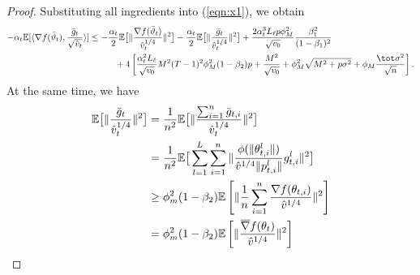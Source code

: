 \documentclass{article}
\begin{document}
\begin{proof}
Substituting all ingredients into (\ref{eqn:x1}), we obtain
\begin{align}\notag
    -\alpha_t \mathbb E[\langle \nabla f(\bar \vartheta_t),\frac{\bar g_t}{\sqrt{\hat v_t}} \rangle] &\leq -\frac{\alpha_t}{2}\mathbb E\big[\Vert \frac{\nabla f(\bar\vartheta_t) }{\hat v_t^{1/4}}\Vert^2 \big]-\frac{\alpha_t}{2}\mathbb E\big[\Vert \frac{\bar g_t }{\hat v_t^{1/4}}\Vert^2 \big]+\frac{2\alpha_t^3 L_\ell p\phi_M^2}{ \sqrt{v_0}}\frac{\beta_1^2}{(1-\beta_1)^2} \\\notag
    &\hspace{0.4in}  + 4 \left[ \frac{\alpha_t^2 L_\ell}{\sqrt{v_0}} M^2 (T-1)^2 \phi_M^2 (1-\beta_2)p + \frac{M^2}{\sqrt{v_0}}+\phi_M^2\sqrt{M^2+p\sigma^2} + \phi_M \frac{\tot \sigma^2}{\sqrt{n}}\right].
\end{align}
At the same time, we have
\begin{align}\notag
    \mathbb E\big[\Vert \frac{\bar g_t }{\hat v_t^{1/4}}\Vert^2\big]&=\frac{1}{n^2}\mathbb E\big[\Vert \frac{\sum_{i=1}^n \bar g_{t,i}}{\hat v_t^{1/4}}\Vert^2 \big]\\\notag
    &=\frac{1}{n^2}\mathbb E\big[ \sum_{l=1}^L \sum_{i=1}^n \Vert  \frac{\phi(\Vert \theta_{t,i}^l\Vert)}{\hat v^{1/4} \Vert p_{t,i}^l\Vert}g_{t,i}^l \Vert^2 \big]\\\notag
    &\geq \phi_m^2(1-\beta_2) \mathbb E\left[ \Vert \frac{1}{n}\sum_{i=1}^n \frac{\nabla f(\theta_{t,i})}{\hat v^{1/4}} \Vert^2 \right]\\\notag
    &=\phi_m^2(1-\beta_2) \mathbb E\left[ \Vert  \frac{\overline\nabla f(\theta_{t})}{\hat v^{1/4}} \Vert^2 \right]
\end{align}


\end{proof}
\end{document}
